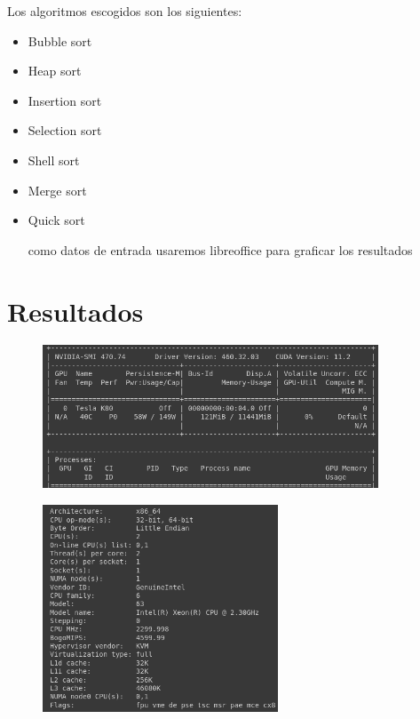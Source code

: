 \documentclass[a4paper]{article}
\begin{document}
Los algoritmos escogidos son los siguientes:

\begin{itemize}


\item  Bubble sort

\item Heap sort

\item Insertion sort

\item Selection sort

\item Shell sort

\item  Merge sort

\item Quick sort

como datos de entrada usaremos libreoffice para graficar los resultados 

\end{itemize}








\section{Resultados}


\begin{figure}[H]%
\centering
\includegraphics[width=10cm]{imagenes/arq2.png}
\caption{}
\end{figure}

\begin{figure}[H]%
\centering
\includegraphics[width=7cm]{imagenes/arquitectura2.png}
\caption{}
\end{figure}
\end{document}
